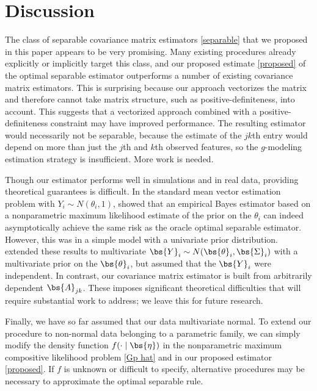 \section{\label{sec:discussion}Discussion}
\label{discussion}

The class of separable covariance matrix estimators \eqref{separable} that we proposed in this paper appears to be very promising. Many existing procedures already explicitly or implicitly target this class, and our proposed estimate \eqref{proposed} of the optimal separable estimator outperforms a number of existing covariance matrix estimators. This is surprising because our approach vectorizes the matrix and therefore cannot take matrix structure, such as positive-definiteness, into account. This suggests that a vectorized approach combined with a positive-definiteness constraint may have improved performance. The resulting estimator would necessarily not be separable, because the estimate of the $jk$th entry would depend on more than just the $j$th and $k$th observed features, so the $g$-modeling estimation strategy is insufficient. More work is needed.

Though our estimator performs well in simulations and in real data, providing theoretical guarantees is difficult. In the standard mean vector estimation problem with $Y_i \sim N(\theta_i, 1)$, \citet{jiang2009general} showed that an empirical Bayes estimator based on a nonparametric maximum likelihood estimate of the prior on the $\theta_i$ can indeed asymptotically achieve the same risk as the oracle optimal separable estimator. However, this was in a simple model with a univariate prior distribution. \citet{saha2020nonparametric} extended these results to multivariate $\bs{Y}_i \sim N(\bs{\theta}_i, \bs{\Sigma}_i)$ with a multivariate prior on the $\bs{\theta}_i$, but assumed that the $\bs{Y}_i$ were independent. In contrast, our covariance matrix estimator is built from arbitrarily dependent $\bs{A}_{jk}$. These imposes significant theoretical difficulties that will require substantial work to address; we leave this for future research.

Finally, we have so far assumed that our data multivariate normal. To extend our procedure to non-normal data belonging to a parametric family, we can simply modify the density function $f(\cdot \mid \bs{\eta})$ in the nonparametric maximum compositive likelihood problem \eqref{Gp hat} and in our proposed estimator \eqref{proposed}. If $f$ is unknown or difficult to specify, alternative procedures may be necessary to approximate the optimal separable rule.
